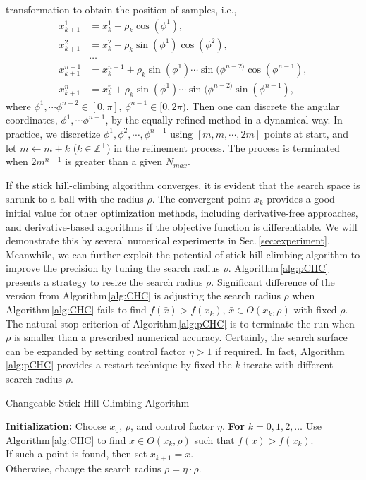 \documentclass[mathpazo]{aamm}
\newcommand{\bmx}{x}
\begin{document}
transformation to obtain the position of samples, i.e.,
\begin{align*}
	x^1_{k+1} &= x^1_{k}+\rho_{k}\cos(\phi^1),
	\\
	x^2_{k+1} &= x^2_{k}+\rho_{k}\sin(\phi^1)\cos(\phi^2),
	\\
	& \dots
	\\
	x^{n-1}_{k+1} &= x^{n-1}_{k}+
	\rho_{k}\sin(\phi^1)\cdots\sin(\phi^{n-2)}\cos(\phi^{n-1}),
	\\
	x^{n}_{k+1} &=
	x^{n}_{k}+\rho_{k}\sin(\phi^1)\cdots\sin(\phi^{n-2)}\sin(\phi^{n-1}),
\end{align*}
where $\phi^1,\cdots\phi^{n-2}\in[0,\pi]$, $\phi^{n-1}\in[0,2\pi)$.
Then one can discrete the angular coordinates,
$\phi^1,\cdots\phi^{n-1}$, by the equally refined method in a
dynamical way.  In practice, we discretize $\phi^1, \phi^2,
\cdots, \phi^{n-1}$ using $[m,m,\cdots,2m]$ points at start,
and let $m\leftarrow m+k$ ($k\in \mathbb{Z}^+$) in the
refinement process. The process is terminated when $2m^{n-1}$ is
greater than a given $N_{max}$.  

If the stick hill-climbing algorithm converges, it is evident that
the search space is shrunk to a ball with the radius $\rho$. 
The convergent point $\bmx_k$ provides a good initial value for
other optimization methods, including derivative-free
approaches, and derivative-based algorithms if the objective
function is differentiable. 
We will demonstrate this by several numerical experiments in
Sec.\,\ref{sec:experiment}.
Meanwhile, we can further exploit the potential of
stick hill-climbing algorithm to improve the precision by tuning the
search radius $\rho$. Algorithm\,\ref{alg:pCHC} presents a
strategy to resize the search radius $\rho$. 
Significant difference of the version from
Algorithm\,\ref{alg:CHC} is adjusting the search radius
$\rho$ when Algorithm\,\ref{alg:CHC} fails to find
$f(\bar\bmx)>f(\bmx_k)$, $\bar{\bmx}\in O(\bmx_k, \rho)$ with
fixed $\rho$. 
The natural stop criterion of Algorithm\,\ref{alg:pCHC} is to
terminate the run when $\rho$ is smaller than a prescribed
numerical accuracy.
Certainly, the search surface can be expanded by setting
control factor $\eta>1$ if required. 
In fact, Algorithm\,\ref{alg:pCHC} provides a restart technique by
fixed the $k$-iterate with different search radius $\rho$.

\begin{algorithm}[]
	\caption{Changeable Stick Hill-Climbing Algorithm} 
	\label{alg:pCHC}
\begin{algorithmic}[]
	\STATE \textbf{Initialization:} Choose $\bmx_0$, $\rho$,
	and control factor $\eta$.
	\STATE \textbf{For} $k=0,1,2,\dots$
	\STATE \hspace{0.5cm} Use Algorithm\,\ref{alg:CHC} to find
	$\bar{\bmx}\in O(\bmx_k, \rho)$ such that
	$f(\bar\bmx)>f(\bmx_k)$.
		 \\
		 \hspace{0.5cm} If such a point is found, then set
						 $\bmx_{k+1}= \bar\bmx$.
		  \\
	 	  \hspace{0.5cm} Otherwise, change the search radius
		  $\rho = \eta \cdot \rho$.
\end{algorithmic}
\end{algorithm}
\end{document}
